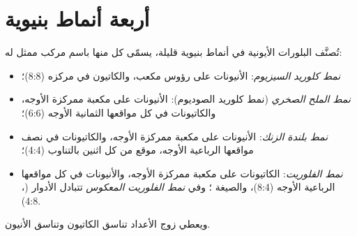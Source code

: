 \section{أربعة أنماط بنيوية}

\begin{definition}\label{def:b1:crystals-ionic-covalent:structure-type}
تُصنَّف البلورات الأيونية في أنماط بنيوية قليلة، يسمّى كل منها
باسم مركب ممثل له:
\begin{itemize}
  \item \emph{نمط كلوريد السيزيوم}: الأنيونات
        على رؤوس مكعب، والكاتيون في مركزه (8:8)؛
  \item \emph{نمط الملح الصخري} (نمط كلوريد
        الصوديوم): الأنيونات على  مكعبة ممركزة الأوجه، والكاتيونات في كل مواقعها
        الثمانية الأوجه (6:6)؛
  \item \emph{نمط بلندة الزنك}: الأنيونات على
         مكعبة ممركزة الأوجه، والكاتيونات في نصف مواقعها الرباعية الأوجه، موقع من كل اثنين
        بالتناوب (4:4)؛
  \item \emph{نمط الفلوريت}: الكاتيونات على
         مكعبة ممركزة الأوجه، والأنيونات في كل مواقعها الرباعية الأوجه (8:4)، والصيغة
        ؛ وفي \emph{نمط الفلوريت المعكوس}
        تتبادل الأدوار (، 4:8).
\end{itemize}
ويعطي زوج الأعداد تناسق الكاتيون وتناسق
الأنيون.
\end{definition}

